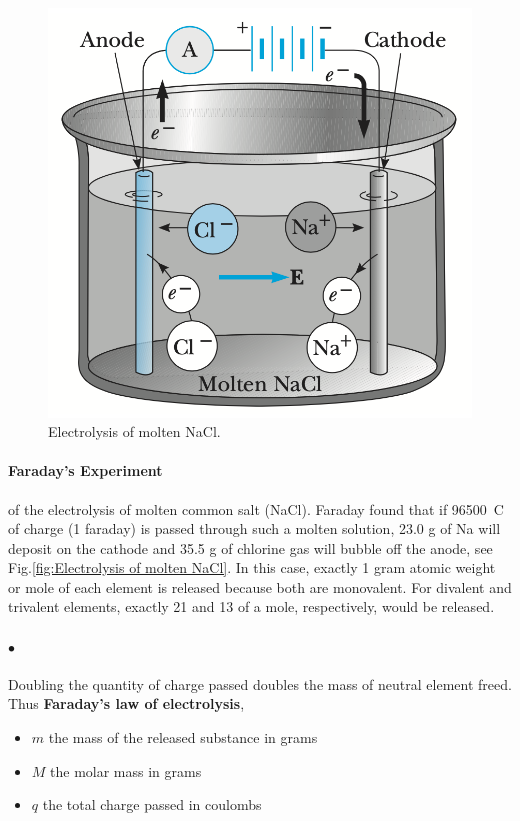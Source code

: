         \begin{figure}
            \includegraphics[width=0.9\linewidth]{figures/Electrolysis of molten NaCl.png}
            \caption{Electrolysis of molten NaCl.}
            \label{fig:Electrolysis of molten NaCl}
        \end{figure}

        \paragraph{Faraday’s Experiment}
        of the electrolysis of molten common salt (NaCl). 
        Faraday found that if \SI{96500}{C} of charge (1 faraday) is passed through such a molten solution, 23.0 g of Na will deposit 
        on the cathode and 35.5 g of chlorine gas will bubble off the anode, see Fig.\eqref{fig:Electrolysis of molten NaCl}. 
        In this case, exactly 1 gram atomic weight 
        or mole of each element is released because both are monovalent. For divalent and trivalent elements, exactly 21 and 13 of 
        a mole, respectively, would be released.

        \paragraph{$\bullet$} Doubling the quantity of charge passed doubles the mass of neutral element freed. Thus 
        \textbf{Faraday’s law of electrolysis}, 
        {\tiny \begin{itemize}
            \item $m$ the mass of the released substance in grams 
            \item $M$ the molar mass in grams
            \item $q$ the total charge passed in coulombs 
        \end{itemize}}

